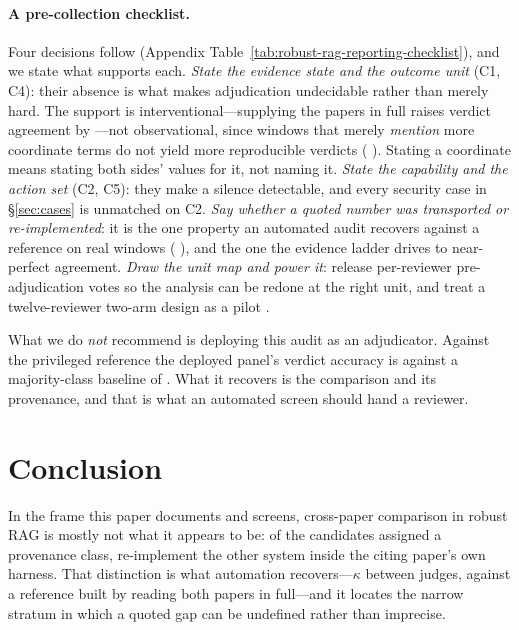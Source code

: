 \documentclass[11pt]{article}
\begin{document}
\paragraph{A pre-collection checklist.}
Four decisions follow (Appendix
Table~\ref{tab:robust-rag-reporting-checklist}), and we state what supports each.
\emph{State the evidence state and the outcome unit} (C1, C4): their absence is
what makes adjudication undecidable rather than merely hard. The support is
interventional---supplying the papers in full raises verdict agreement by
\LadVdDeltaCite{} \LadVdDeltaCiteCI{}---not observational, since windows that
merely \emph{mention} more coordinate terms do not yield more reproducible
verdicts (\DiscDiff{} \DiscDiffCI{}). Stating a coordinate means stating both
sides' values for it, not naming it. \emph{State the capability and the action
set} (C2, C5): they make a silence detectable, and every security case in
\S\ref{sec:cases} is unmatched on C2. \emph{Say whether a quoted number was
transported or re-implemented}: it is the one property an automated audit
recovers against a reference on real windows (\DepPvAcc{} \DepPvCI{}), and the
one the evidence ladder drives to near-perfect agreement. \emph{Draw the unit
map and power it}: release per-reviewer pre-adjudication votes so the analysis
can be redone at the right unit, and treat a twelve-reviewer two-arm design as a
pilot \citep{card2020power}.

\noindent What we do \emph{not} recommend is deploying this audit as an
adjudicator. Against the privileged reference the deployed panel's verdict
accuracy is \DepVdAcc{} against a majority-class baseline of \DepVdBase{}. What
it recovers is the comparison and its provenance, and that is what an automated
screen should hand a reviewer.

\section{Conclusion}

In the frame this paper documents and screens, cross-paper comparison in robust
RAG is mostly not what it appears to be: of the \ProvClassified{} candidates
assigned a provenance class, \ProvReimplemented{} re-implement the other system
inside the citing paper's own harness. That distinction is what automation
recovers---$\kappa$ \DecProvK{} between judges, \DepPvAcc{} \DepPvCI{} against a
reference built by reading both papers in full---and it locates the narrow
stratum in which a quoted gap can be undefined rather than imprecise.
\end{document}
